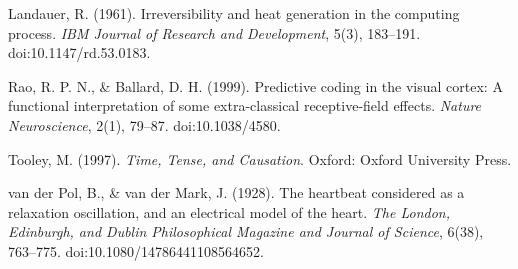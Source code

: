 \documentclass[11pt,oneside]{report}
\theoremstyle{definition}
\theoremstyle{remark}
\newenvironment{reflist}
  {\par\small\setlength{\parindent}{0pt}%
   \setlength{\leftskip}{1.6em}\setlength{\parindent}{-1.6em}%
   \setlength{\parskip}{0.4em}%
   \raggedright\hyphenpenalty=50\exhyphenpenalty=50\relax
   \sloppy}
  {\par}
\begin{document}
\begin{reflist}
Landauer, R. (1961). Irreversibility and heat generation in the computing process. \emph{IBM Journal of Research and Development}, 5(3), 183--191. doi:10.1147/rd.53.0183.

Rao, R. P. N., \& Ballard, D. H. (1999). Predictive coding in the visual cortex: A functional interpretation of some extra-classical receptive-field effects. \emph{Nature Neuroscience}, 2(1), 79--87. doi:10.1038/4580.

Tooley, M. (1997). \emph{Time, Tense, and Causation}. Oxford: Oxford University Press.

van der Pol, B., \& van der Mark, J. (1928). The heartbeat considered as a relaxation oscillation, and an electrical model of the heart. \emph{The London, Edinburgh, and Dublin Philosophical Magazine and Journal of Science}, 6(38), 763--775. doi:10.1080/14786441108564652.
\end{reflist}
\end{document}
